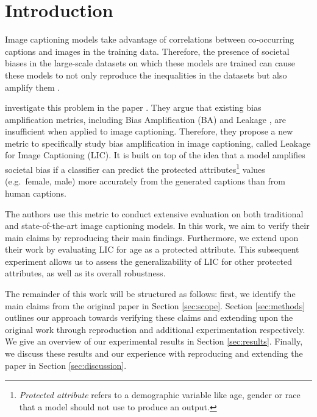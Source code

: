     \section{Introduction}\label{sec:intro}
Image captioning models take advantage of correlations between co-occurring captions and images in the training data. Therefore, the presence of societal biases in the large-scale datasets on which these models are trained can cause these models to not only reproduce the inequalities in the datasets but also amplify them \cite{zhao}. %

\citeauthor{hirota} investigate this problem in the paper .
They argue that existing bias amplification metrics, including Bias Amplification (BA) \cite{zhao} and Leakage \cite{leakage}, are insufficient when applied to image captioning. Therefore, they propose a new metric to specifically study bias amplification in image captioning, called Leakage for Image Captioning (LIC).  It is built on top of the idea that a model amplifies societal bias if a classifier can predict the protected attributes\footnote{\textit{Protected attribute} refers to a demographic variable like age, gender or race that a model should not use to produce an output.} values (e.g.\ female, male) more accurately from the generated captions than from human captions. 

The authors use this metric to conduct extensive evaluation on both traditional and state-of-the-art image captioning models. In this work, we aim to verify their main claims by reproducing their main findings. Furthermore, we extend upon their work by evaluating LIC for age as a protected attribute. This subsequent experiment allows us to assess the generalizability of LIC for other protected attributes, as well as its overall robustness.

The remainder of this work will be structured as follows: first, we identify the main claims from the original paper in Section \ref{sec:scope}. Section \ref{sec:methods} outlines our approach towards verifying these claims and extending upon the original work through reproduction and additional experimentation respectively. We give an overview of our experimental results in Section \ref{sec:results}. Finally, we discuss these results and our experience with reproducing and extending the paper in Section \ref{sec:discussion}.

